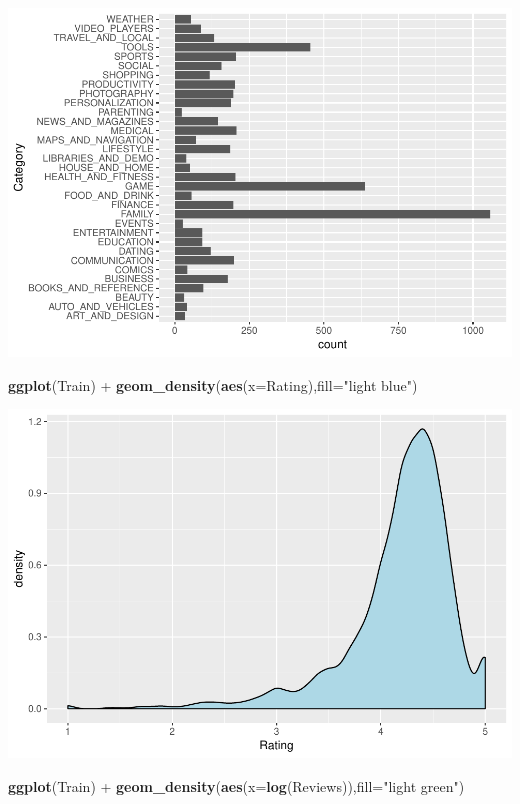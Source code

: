 \documentclass[]{article}
\newenvironment{Shaded}{\begin{snugshade}}{\end{snugshade}}
\newcommand{\KeywordTok}[1]{\textcolor[rgb]{0.13,0.29,0.53}{\textbf{{#1}}}}
\newcommand{\DataTypeTok}[1]{\textcolor[rgb]{0.13,0.29,0.53}{{#1}}}
\newcommand{\StringTok}[1]{\textcolor[rgb]{0.31,0.60,0.02}{{#1}}}
\newcommand{\NormalTok}[1]{{#1}}
\begin{document}
\includegraphics{Project_2_Work_files/figure-latex/unnamed-chunk-15-1.pdf}

\begin{Shaded}
\begin{Highlighting}[]
\KeywordTok{ggplot}\NormalTok{(Train) +}\StringTok{ }\KeywordTok{geom_density}\NormalTok{(}\KeywordTok{aes}\NormalTok{(}\DataTypeTok{x=}\NormalTok{Rating),}\DataTypeTok{fill=}\StringTok{"light blue"}\NormalTok{)}
\end{Highlighting}
\end{Shaded}

\includegraphics{Project_2_Work_files/figure-latex/unnamed-chunk-15-2.pdf}

\begin{Shaded}
\begin{Highlighting}[]
\KeywordTok{ggplot}\NormalTok{(Train) +}\StringTok{ }\KeywordTok{geom_density}\NormalTok{(}\KeywordTok{aes}\NormalTok{(}\DataTypeTok{x=}\KeywordTok{log}\NormalTok{(Reviews)),}\DataTypeTok{fill=}\StringTok{"light green"}\NormalTok{)}
\end{Highlighting}
\end{Shaded}
\end{document}
